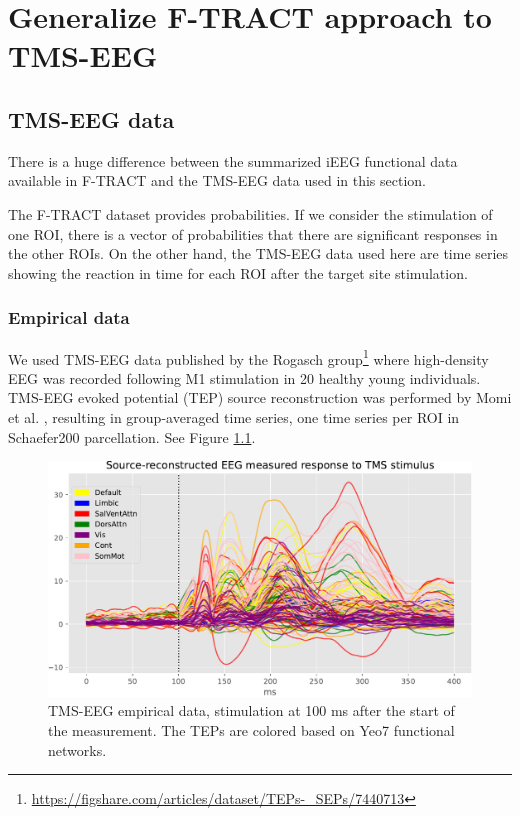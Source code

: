 \chapter{Generalize F-TRACT approach to TMS-EEG}\label{ch:pytepfit}

\section{TMS-EEG data}\label{sec:reponse_definition}

There is a huge difference between the summarized iEEG functional data available in F-TRACT and the TMS-EEG data used in this section. 

The F-TRACT dataset provides probabilities. If we consider the stimulation of one ROI, there is a vector of probabilities that there are significant responses in the other ROIs. On the other hand, the TMS-EEG data used here are time series showing the reaction in time for each ROI after the target site stimulation. 

\subsection{Empirical data}

We used TMS-EEG data published by the Rogasch group\footnote{\url{https://figshare.com/articles/dataset/TEPs-_SEPs/7440713}} \cite{biabani_characterizing_2019} where high-density EEG was recorded following M1 stimulation in 20 healthy young individuals. TMS-EEG evoked potential (TEP) source reconstruction was performed by Momi et al. \cite{momi_tms-evoked_2023}, resulting in group-averaged time series, one time series per ROI in Schaefer200 parcellation. See Figure \ref{fig:tms-empirical-data}. 

\begin{figure}
    \centering
    \includegraphics[width=\textwidth]{images/nootebook_generated/pytepfit_results/empirical/200/not_over_threshold_nan/data.pdf}
    \caption[TMS-EEG empirical data]{TMS-EEG empirical data, stimulation at 100 ms after the start of the measurement. The TEPs are colored based on Yeo7 functional networks.}
    \label{fig:tms-empirical-data}
\end{figure}

